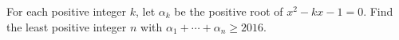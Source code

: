 For each positive integer $k$, let $\alpha_k$ be the positive root of $x^2-kx-1=0$. Find the least positive integer $n$ with $\alpha_1+\cdots+\alpha_n\ge2016$.
